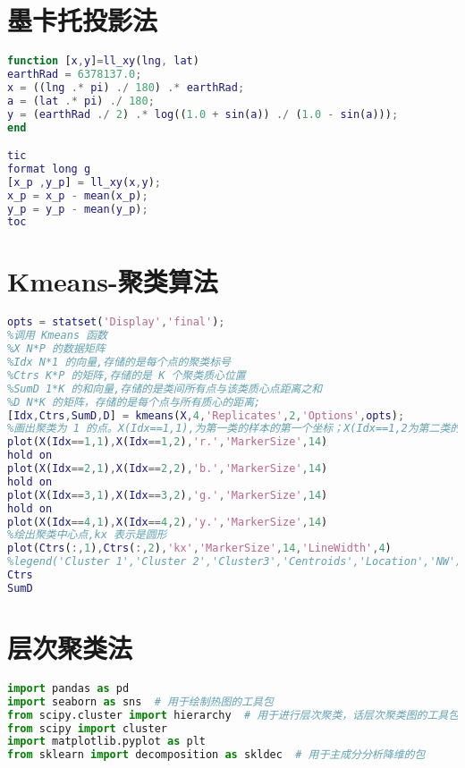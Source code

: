 \documentclass[withoutpreface,bwprint]{cumcmthesis} %
\begin{document}








\newpage
\begin{appendices}
	\section{墨卡托投影法}
	\begin{lstlisting}[language=matlab]
function [x,y]=ll_xy(lng, lat)
earthRad = 6378137.0;
x = ((lng .* pi) ./ 180) .* earthRad;
a = (lat .* pi) ./ 180;
y = (earthRad ./ 2) .* log((1.0 + sin(a)) ./ (1.0 - sin(a)));
end

tic
format long g
[x_p ,y_p] = ll_xy(x,y);
x_p = x_p - mean(x_p);
y_p = y_p - mean(y_p);
toc
 \end{lstlisting}

	\section{Kmeans-聚类算法}
	\begin{lstlisting}[language=matlab]
opts = statset('Display','final');
%调用 Kmeans 函数
%X N*P 的数据矩阵
%Idx N*1 的向量,存储的是每个点的聚类标号
%Ctrs K*P 的矩阵,存储的是 K 个聚类质心位置
%SumD 1*K 的和向量,存储的是类间所有点与该类质心点距离之和
%D N*K 的矩阵，存储的是每个点与所有质心的距离;
[Idx,Ctrs,SumD,D] = kmeans(X,4,'Replicates',2,'Options',opts);
%画出聚类为 1 的点。X(Idx==1,1),为第一类的样本的第一个坐标；X(Idx==1,2为第二类的样本的第二个坐标
plot(X(Idx==1,1),X(Idx==1,2),'r.','MarkerSize',14)
hold on
plot(X(Idx==2,1),X(Idx==2,2),'b.','MarkerSize',14)
hold on
plot(X(Idx==3,1),X(Idx==3,2),'g.','MarkerSize',14)
hold on 
plot(X(Idx==4,1),X(Idx==4,2),'y.','MarkerSize',14)
%绘出聚类中心点,kx 表示是圆形
plot(Ctrs(:,1),Ctrs(:,2),'kx','MarkerSize',14,'LineWidth',4)
%legend('Cluster 1','Cluster 2','Cluster3','Centroids','Location','NW')
Ctrs
SumD
 \end{lstlisting}

	\section{层次聚类法}
	\begin{lstlisting}[language=python]
import pandas as pd
import seaborn as sns  # 用于绘制热图的工具包
from scipy.cluster import hierarchy  # 用于进行层次聚类，话层次聚类图的工具包
from scipy import cluster
import matplotlib.pyplot as plt
from sklearn import decomposition as skldec  # 用于主成分分析降维的包


\end{lstlisting}
\end{appendices}
\end{document}
